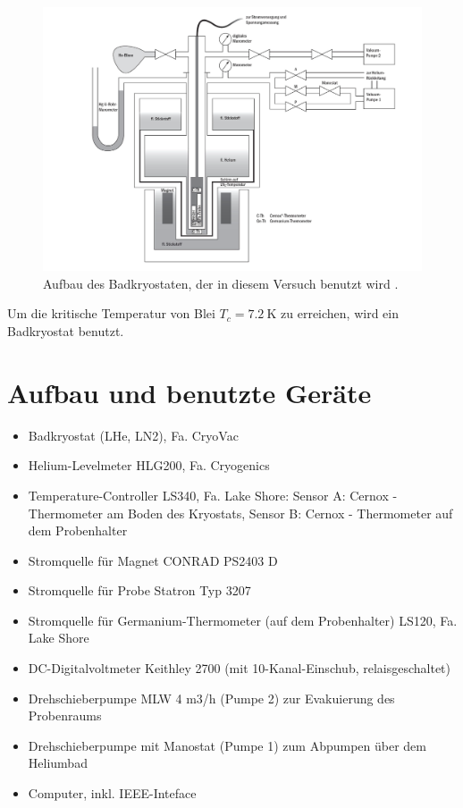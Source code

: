\documentclass[german,  %
parskip=full,  %
headsepline]{scrartcl}
\begin{document}
\begin{figure}
    \centering
    \includegraphics[width=0.8\linewidth]{su2_aufbau.png}
    \caption{Aufbau des Badkryostaten, der in diesem Versuch benutzt wird \cite{Platzanleitung}.}
    \label{fig:aufbau}
\end{figure}
Um die kritische Temperatur von Blei $T_c= \SI{7.2}{\kelvin}$ zu erreichen, wird ein Badkryostat benutzt.\\

\section{Aufbau und benutzte Geräte}
    \begin{itemize}
        \item Badkryostat (LHe, LN2), Fa. CryoVac 
        \item Helium-Levelmeter HLG200, Fa. Cryogenics 
        \item Temperature-Controller LS340, Fa. Lake Shore: Sensor A: Cernox - Thermometer am Boden des Kryostats, Sensor B: Cernox - Thermometer auf dem Probenhalter 
        \item Stromquelle für Magnet CONRAD PS2403 D 
        \item Stromquelle für Probe Statron Typ 3207 
        \item Stromquelle  für  Germanium-Thermometer  (auf  dem  Probenhalter)  LS120,  Fa. Lake Shore 
        \item DC-Digitalvoltmeter Keithley 2700 (mit 10-Kanal-Einschub, relaisgeschaltet) 
        \item Drehschieberpumpe MLW 4 m3/h (Pumpe 2) zur Evakuierung des Probenraums 
        \item Drehschieberpumpe mit Manostat (Pumpe 1) zum Abpumpen über dem Heliumbad 
        \item Computer, inkl. IEEE-Inteface 
    \end{itemize}
\end{document}
